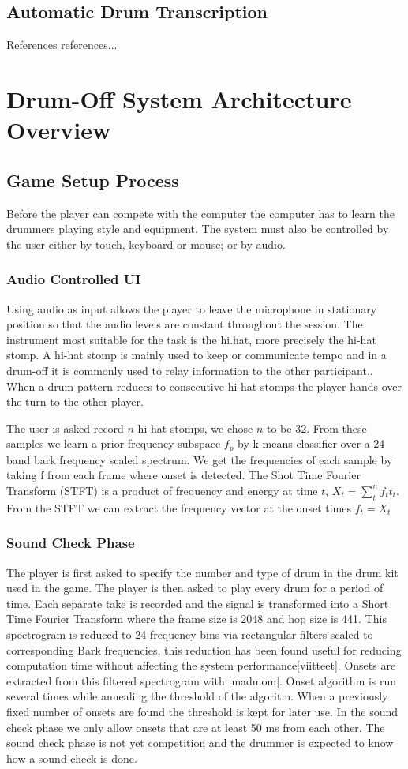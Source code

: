 \documentclass[10pt]{article}
\begin{document}
\subsection{Automatic Drum Transcription}
References references...
\section{Drum-Off System Architecture Overview}
\subsection{Game Setup Process}
Before the player can compete with the computer the computer has to learn the drummers playing style and equipment. The system must also be controlled by the user either by touch, keyboard or mouse; or by audio. 
\subsubsection{Audio Controlled UI}
Using audio as input allows the player to leave the microphone in stationary position so that the audio levels are constant throughout the session. The instrument most suitable for the task is the hi.hat, more precisely the hi-hat stomp. A hi-hat stomp is mainly used to keep or communicate tempo and in a drum-off it is commonly used to relay information to the other participant.. When a drum pattern reduces to consecutive hi-hat stomps the player hands over the turn to the other player.


The user is asked record $n$ hi-hat stomps, we chose $n$ to be 32. From these samples we learn a prior frequency subspace $f_{p}$ by k-means \iffalse K* Mikä tämä on??\fi classifier over a 24 band bark frequency scaled spectrum. We get the frequencies of each sample by taking f from each frame where onset is detected. The Shot Time Fourier Transform (STFT) is a product of frequency and energy at time $t$, $X_t= \sum_{t} ^{n}f_t{t_t}$. From the STFT we can extract the frequency vector at the onset times $f_t=X_t$

\subsubsection{Sound Check Phase}

The player is first asked to specify the number and type of drum in the drum kit used in the game.
The player is  then asked to play every drum for a period of time. Each separate take is recorded and the signal is transformed into a Short Time Fourier Transform where the frame size is 2048 and hop size is 441. This spectrogram is reduced to 24 frequency bins via rectangular filters scaled to corresponding Bark frequencies, this reduction has been found useful for reducing computation time without affecting the system performance[viitteet]. Onsets are extracted from this filtered spectrogram with [madmom]. Onset algorithm is run several times while annealing the threshold of the algoritm. When a previously fixed number of onsets are found the threshold is kept for later use. In the sound check phase we only allow onsets that are at least 50 ms from each other. The sound check phase is not yet competition and the drummer is expected to know how a sound check is done. 
\end{document}
